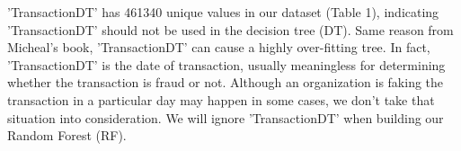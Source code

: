 \documentclass{article}
\begin{document}
\begin{table}[H]
    \centering
    \caption{ Data overview}
\end{table}
'TransactionDT' has 461340 unique values in our dataset (Table 1), indicating 'TransactionDT' should not be used in the decision tree (DT). Same reason from Micheal's book, 'TransactionDT' can cause a highly over-fitting tree. In fact, 'TransactionDT' is the date of transaction, usually meaningless for determining whether the transaction is fraud or not. Although an organization is faking the transaction in a particular day may happen in some cases, we don't take that situation into consideration. We will ignore 'TransactionDT' when building our Random Forest (RF).
\end{document}
